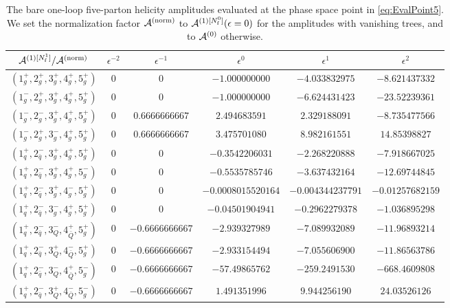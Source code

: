 \begin{table}[h]
\begin{adjustbox}{width=1\textwidth}
\begin{tabular}{cccccc}
      $\mathcal{A}^{(1)[N_\mathrm{f}^1]}/\mathcal{A}^\mathrm{(norm)}$   &   $\epsilon^{-2}$   &   $\epsilon^{-1}$   &   $\epsilon^{0}$   &   $\epsilon^{1}$  &  $\epsilon^{2}$ \\
      \midrule
      $(1_g^+,2_g^+,3_g^+,4_g^+,5_g^+)$ & $0$ & $0$ &
      $-1.000000000$ & $-4.033832975$ & $-8.621437332$ \\
      $(1_g^-,2_g^+,3_g^+,4_g^+,5_g^+)$ & $0$ & $0$ &
      $-1.000000000$ & $-6.624431423$ & $-23.52239361$ \\
      $(1_g^-,2_g^-,3_g^+,4_g^+,5_g^+)$ &  $0$ & $0.6666666667$ &
      $2.494683591$ & $2.329188091$ & $-8.735477566$ \\
      $(1_g^-,2_g^+,3_g^-,4_g^+,5_g^+)$ &  $0$ & $0.6666666667$ &
      $3.475701080$ &  $8.982161551$ &  $14.85398827$ \\
      \midrule
      $(1_q^+,2_{\bar q}^-,3_g^+,4_g^+,5_g^+)$ & $0$ & $0$ &
      $-0.3542206031$ & $-2.268220888$ & $-7.918667025$ \\
      $(1_q^+,2_{\bar q}^-,3_g^+,4_g^+,5_g^-)$ & $0$ & $0$ &
      $-0.5535785746$ & $-3.637432164$ & $-12.69744845$ \\
      $(1_q^+,2_{\bar q}^-,3_g^+,4_g^-,5_g^+)$ & $0$ & $0$ &
      $-0.0008015520164$ & $-0.004344237791$ & $-0.01257682159$
      \\
      $(1_q^+,2_{\bar q}^-,3_g^-,4_g^+,5_g^+)$ & $0$ & $0$ &
      $-0.04501904941$ & $-0.2962279378$ & $-1.036895298$ \\
      \midrule
      $(1_q^+,2_{\bar q}^-,3_Q^-,4_{\bar Q}^+,5_g^+)$ & $0$ &
      $-0.6666666667$ & $-2.939327989$ & $-7.089932089$ &
      $-11.96893214$ 
      \\
      $(1_q^+,2_{\bar q}^-,3_Q^+,4_{\bar Q}^-,5_g^+)$ & $0$ &
      $-0.6666666667$ & $-2.933154494$ & $-7.055606900$ &
      $-11.86563786$ 
      \\
      $(1_q^+,2_{\bar q}^-,3_Q^-,4_{\bar Q}^+,5_g^-)$ & $0$ &
      $-0.6666666667$ & $-57.49865762$ & $-259.2491530$ &
      $-668.4609808$
      \\
      $(1_q^+,2_{\bar q}^-,3_Q^+,4_{\bar Q}^-,5_g^-)$ & $0$ &
      $-0.6666666667$ & $1.491351996$ & $9.944256190$ & 
      $24.03526126$ \\
      \bottomrule
    \end{tabular}
  \end{adjustbox}
  \caption{The bare one-loop five-parton helicity amplitudes 
  evaluated at the phase space point in \cref{eq:EvalPoint5}. We set the
    normalization factor $\mathcal{A}^\mathrm{(norm)}$ to $\mathcal{A}^{(1)[N_\mathrm{f}^0]}(\epsilon=0)$ for the
    amplitudes with vanishing trees, and to $\mathcal{A}^{(0)}$ otherwise.}
  \label{tab:results5parton1L}
\end{table}

